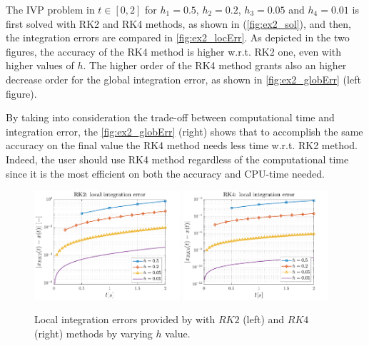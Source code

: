\documentclass[11pt,a4paper,oneside]{article}
\begin{document}
The IVP problem in $t\in[0,2]$ for $h_1 = 0.5$, $h_2 = 0.2$, $h_3 = 0.05$ and $h_4 = 0.01$ is 
first solved with RK2 and RK4 methods, as shown in (\autoref{fig:ex2_sol}), and then, the 
integration errors are compared in \autoref{fig:ex2_locErr}. As depicted in the two figures, 
the accuracy of the RK4 method is higher w.r.t. RK2 one, even with higher values of $h$. 
The higher order of the RK4 method grants also an higher decrease order for the global 
integration error, as shown in \autoref{fig:ex2_globErr} (left figure).

By taking into consideration the trade-off between computational time and integration error, 
the \autoref{fig:ex2_globErr} (right) shows that to accomplish the same accuracy on the final 
value the RK4 method needs less time w.r.t. RK2 method. Indeed, the user should use RK4 method 
regardless of the computational time since it is the most efficient on both the accuracy and 
CPU-time needed.

\begin{figure}[ht]
    \centering
    \includegraphics[width = 0.48\textwidth]{gfx/ex2_3.pdf}
    \includegraphics[width = 0.48\textwidth]{gfx/ex2_4.pdf}
    \caption{Local integration errors provided by with $RK2$ (left) and $RK4$ (right) methods by varying $h$ value.}
    \label{fig:ex2_locErr}
\end{figure}
\end{document}
